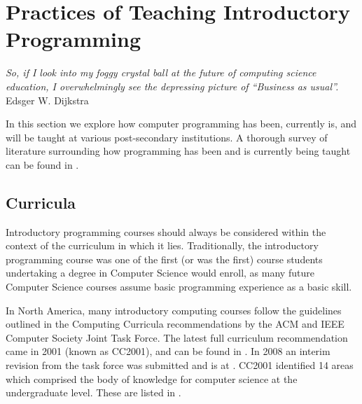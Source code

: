 \section{Practices of Teaching Introductory Programming}

\begin{flushright}
\textit{So, if I look into my foggy crystal ball at the future of computing science education, I overwhelmingly see the depressing picture of ``Business as usual''.}
\\
Edsger W. Dijkstra \cite{Dijkstra89} \\
\end{flushright}


In this section we explore how computer programming has been, currently is, and will be taught at various post-secondary institutions.  A thorough survey of literature surrounding how programming has been and is currently being taught can be found in \cite{Pears07}.

\subsection{Curricula}

Introductory programming courses should always be considered within the context of the curriculum in which it lies.  Traditionally, the introductory programming course was one of the first (or was the first) course students undertaking a degree in Computer Science would enroll, as many future Computer Science courses assume basic programming experience as a basic skill.

In North America, many introductory computing courses follow the guidelines outlined in the Computing Curricula recommendations by the ACM and IEEE Computer Society Joint Task Force.  The latest full curriculum recommendation came in 2001 (known as CC2001), and can be found in \cite{cc2001}.  In 2008 an interim revision from the task force was submitted and is at \cite{cs2008}.  CC2001 identified 14 areas which comprised the body of knowledge for computer science at the undergraduate level.  These are listed in .


